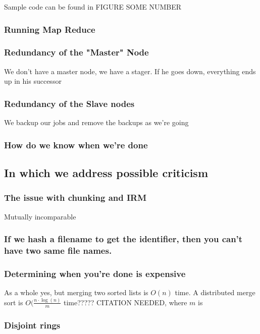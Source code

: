 \documentclass[conference, compsocconf, letterpaper]{IEEEtran}
\begin{document}
Sample code can be found in FIGURE SOME NUMBER



\subsubsection{Running Map Reduce}
\subsubsection{Redundancy of the "Master" Node}
We don't have a master node, we have a stager.  If he goes down, everything ends up in his successor



\subsubsection{Redundancy of the Slave nodes}
We backup our jobs and remove the backups as we're going

\subsubsection{How do we know when we're done}


\subsection{In which we address possible criticism}
\subsubsection{The issue with chunking and IRM}
Mutually incomparable

\subsubsection{If we hash a filename to get the identifier, then you can't have two same file names.}
\subsubsection{Determining when you're done is expensive}
As a whole yes, but merging two sorted lists is $O(n)$ time.  A distributed merge sort is $O( \frac{n \cdot \log (n)}{m} $ time????? CITATION NEEDED, where $m$ is 


\subsubsection{Disjoint rings}
\end{document}
